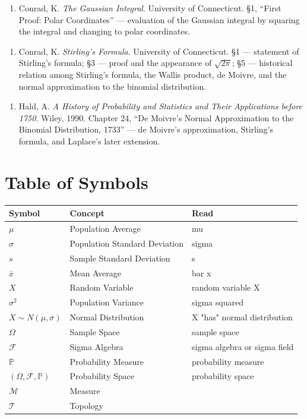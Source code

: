 \documentclass{article}
\begin{document}
\begin{enumerate}
    \item Conrad, K. \emph{The Gaussian Integral}. University of Connecticut. §1, “First Proof: Polar Coordinates” — evaluation of the Gaussian integral by squaring the integral and changing to polar coordinates.
\end{enumerate}

\begin{enumerate}
    \item Conrad, K. \emph{Stirling's Formula}. University of Connecticut. §1 — statement of Stirling's formula; §3 — proof and the appearance of $\sqrt{2\pi}$; §5 — historical relation among Stirling's formula, the Wallis product, de Moivre, and the normal approximation to the binomial distribution.
\end{enumerate}

\begin{enumerate}
    \item Hald, A. \emph{A History of Probability and Statistics and Their Applications before 1750}. Wiley, 1990. Chapter 24, “De Moivre's Normal Approximation to the Binomial Distribution, 1733” — de Moivre's approximation, Stirling's formula, and Laplace's later extension.
\end{enumerate}

\newpage
\section{Table of Symbols}
\begin{tabularx}{1\textwidth} {| >{\raggedright\arraybackslash}X | >{\raggedright\arraybackslash}X | >{\raggedright\arraybackslash}X |}
\hline
Symbol & Concept & Read \\
\hline
$\mu$ & Population Average & mu \\
\hline
$\sigma$ & Population Standard Deviation & sigma \\
\hline
$s$ & Sample Standard Deviation & s \\
\hline
$\bar{x}$ & Mean Average & bar x \\
\hline
$X$ & Random Variable & random variable X \\
\hline
$\sigma^2$ & Population Variance & sigma squared \\
\hline
$X \sim N(\mu, \sigma)$ & Normal Distribution & X "has" normal distribution \\
\hline
$\Omega$ & Sample Space & sample space \\
\hline
$\mathcal{F}$ & Sigma Algebra & sigma algebra or sigma field \\
\hline
$\mathbb{P}$ & Probability Measure & probability measure \\
\hline
$(\Omega, \mathcal{F}, \mathbb{P})$ & Probability Space & probability space \\
\hline
$\mathcal{M}$ & Measure &  \\
\hline
$\mathcal{T}$ & Topology &  \\
\hline
\end{tabularx}
\end{document}
